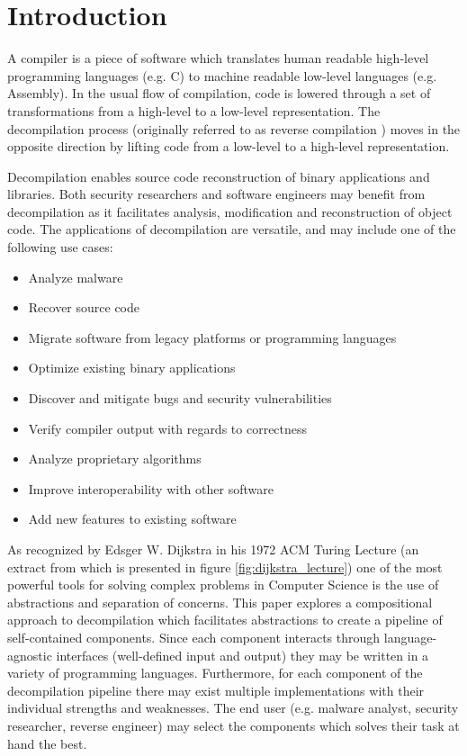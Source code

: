 
\section{Introduction}
\label{sec:introduction}

A compiler is a piece of software which translates human readable high-level programming languages (e.g. C) to machine readable low-level languages (e.g. Assembly). In the usual flow of compilation, code is lowered through a set of transformations from a high-level to a low-level representation. The decompilation process (originally referred to as reverse compilation \cite{rev_comp}) moves in the opposite direction by lifting code from a low-level to a high-level representation.

Decompilation enables source code reconstruction of binary applications and libraries. Both security researchers and software engineers may benefit from decompilation as it facilitates analysis, modification and reconstruction of object code. The applications of decompilation are versatile, and may include one of the following use cases:

\begin{itemize}
	\item Analyze malware
	\item Recover source code
	\item Migrate software from legacy platforms or programming languages
	\item Optimize existing binary applications
	\item Discover and mitigate bugs and security vulnerabilities
	\item Verify compiler output with regards to correctness
	\item Analyze proprietary algorithms
	\item Improve interoperability with other software
	\item Add new features to existing software
\end{itemize}

As recognized by Edsger W. Dijkstra in his 1972 ACM Turing Lecture (an extract from which is presented in figure \ref{fig:dijkstra_lecture}) one of the most powerful tools for solving complex problems in Computer Science is the use of abstractions and separation of concerns. This paper explores a compositional approach to decompilation which facilitates abstractions to create a pipeline of self-contained components. Since each component interacts through language-agnostic interfaces (well-defined input and output) they may be written in a variety of programming languages. Furthermore, for each component of the decompilation pipeline there may exist multiple implementations with their individual strengths and weaknesses. The end user (e.g. malware analyst, security researcher, reverse engineer) may select the components which solves their task at hand the best.

